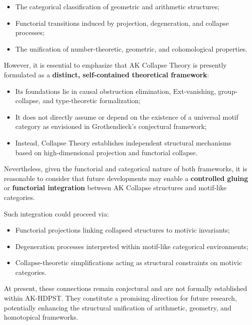 \documentclass[11pt]{article}
\begin{document}
\begin{itemize}
    \item The categorical classification of geometric and arithmetic structures;
    \item Functorial transitions induced by projection, degeneration, and collapse processes;
    \item The unification of number-theoretic, geometric, and cohomological properties.
\end{itemize}

However, it is essential to emphasize that AK Collapse Theory is presently formulated as a \textbf{distinct, self-contained theoretical framework}:

\begin{itemize}
    \item Its foundations lie in causal obstruction elimination, Ext-vanishing, group-collapse, and type-theoretic formalization;
    \item It does not directly assume or depend on the existence of a universal motif category as envisioned in Grothendieck's conjectural framework;
    \item Instead, Collapse Theory establishes independent structural mechanisms based on high-dimensional projection and functorial collapse.
\end{itemize}

Nevertheless, given the functorial and categorical nature of both frameworks, it is reasonable to consider that future developments may enable a \textbf{controlled gluing} or \textbf{functorial integration} between AK Collapse structures and motif-like categories.

Such integration could proceed via:

\begin{itemize}
    \item Functorial projections linking collapsed structures to motivic invariants;
    \item Degeneration processes interpreted within motif-like categorical environments;
    \item Collapse-theoretic simplifications acting as structural constraints on motivic categories.
\end{itemize}

At present, these connections remain conjectural and are not formally established within AK-HDPST. They constitute a promising direction for future research, potentially enhancing the structural unification of arithmetic, geometry, and homotopical frameworks.
\end{document}
